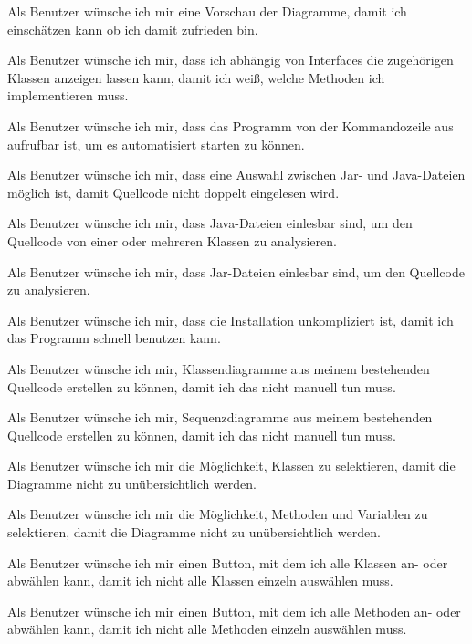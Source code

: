 Als Benutzer wünsche ich mir eine Vorschau der Diagramme, damit ich einschätzen kann ob ich damit zufrieden bin.
\nsecend

Als Benutzer wünsche ich mir, dass ich abhängig von Interfaces die zugehörigen Klassen anzeigen lassen kann, damit ich weiß, welche Methoden ich implementieren muss.
\nsecend

Als Benutzer wünsche ich mir, dass das Programm von der Kommandozeile aus aufrufbar ist, um es automatisiert starten zu können.
\nsecend

Als Benutzer wünsche ich mir, dass eine Auswahl zwischen Jar- und Java-Dateien möglich ist, damit Quellcode nicht doppelt eingelesen wird.
\nsecend

Als Benutzer wünsche ich mir, dass Java-Dateien einlesbar sind, um den Quellcode von einer oder mehreren Klassen zu analysieren.
\nsecend

Als Benutzer wünsche ich mir, dass Jar-Dateien einlesbar sind, um den Quellcode zu analysieren.
\nsecend
\nsecend

Als Benutzer wünsche ich mir, dass die Installation unkompliziert ist, damit ich das Programm schnell benutzen kann.
\nsecend

Als Benutzer wünsche ich mir, Klassendiagramme aus meinem bestehenden Quellcode erstellen zu können, damit ich das nicht manuell tun muss.
\nsecend

Als Benutzer wünsche ich mir, Sequenzdiagramme aus meinem bestehenden Quellcode erstellen zu können, damit ich das nicht manuell tun muss.
\nsecend

Als Benutzer wünsche ich mir die Möglichkeit, Klassen zu selektieren, damit die Diagramme nicht zu unübersichtlich werden.
\nsecend

Als Benutzer wünsche ich mir die Möglichkeit, Methoden und Variablen zu selektieren, damit die Diagramme nicht zu unübersichtlich werden.
\nsecend

Als Benutzer wünsche ich mir einen Button, mit dem ich alle Klassen an- oder abwählen kann, damit ich nicht alle Klassen einzeln auswählen muss.
\nsecend

Als Benutzer wünsche ich mir einen Button, mit dem ich alle Methoden an- oder abwählen kann, damit ich nicht alle Methoden einzeln auswählen muss.
\nsecend

